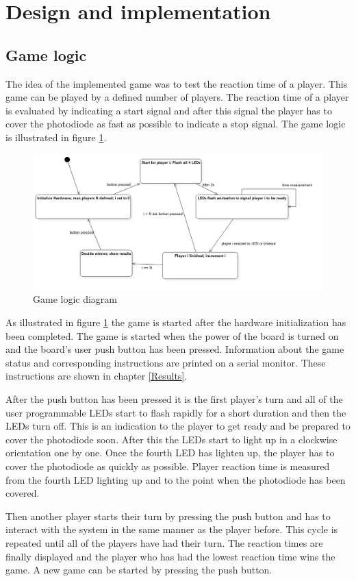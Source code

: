 \pagebreak


\section{Design and implementation}
\subsection{Game logic}
The idea of the implemented game was to test the reaction time of a player. This game can be played by a defined number of players. The reaction time of a player is evaluated by indicating a start signal and after this signal the player has to cover the photodiode as fast as possible to indicate a stop signal. The game logic is illustrated in figure \ref{fig:GameLogicDiagram}. 

\begin{figure}[htbp]
  \centering
     \includegraphics[width=1\textwidth]{./figures/FSM_Diagram.png}
  \caption{Game logic diagram}
  \label{fig:GameLogicDiagram}
\end{figure}

As illustrated in figure \ref{fig:GameLogicDiagram} the game is started after the hardware initialization has been completed. The game is started when the power of the board is turned on and the board's user push button has been pressed. Information about the game status and corresponding instructions are printed on a serial monitor. These instructions are shown in chapter \ref{Results}.\\
\par
After the push button has been pressed it is the first player's turn and all of the user programmable LEDs start to flash rapidly for a short duration and then the LEDs turn off. This is an indication to the player to get ready and be prepared to cover the photodiode soon. After this the LEDs start to light up in a clockwise orientation one by one. Once the fourth LED has lighten up, the player has to cover the photodiode as quickly as possible. Player reaction time is measured from the fourth LED lighting up and to the point when the photodiode has been covered.\\ 
\par
Then another player starts their turn by pressing the push button and has to interact with the system in the same manner as the player before. This cycle is repeated until all of the players have had their turn. The reaction times are finally displayed and the player who has had the lowest reaction time wins the game. A new game can be started by pressing the push button.


